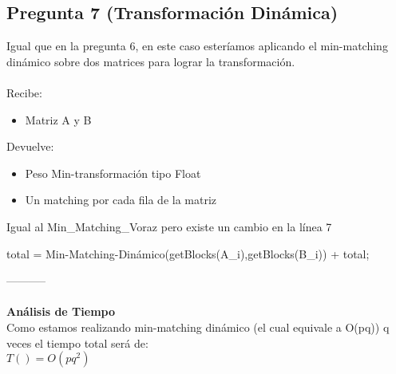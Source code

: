 \documentclass{article}
\newcommand{\TITLE}[1]{\item[#1]}
\begin{document}
		\subsection*{Pregunta 7 (Transformación Dinámica)}
		Igual que en la pregunta 6,  en este caso  esteríamos aplicando el min-matching dinámico sobre dos matrices para lograr la transformación.\\\\
		Recibe:
		\begin{itemize}
			\item Matriz A y B
		\end{itemize}
		Devuelve: 
		\begin{itemize}
			\item Peso Min-transformación tipo Float
			\item Un matching por cada fila de la matriz
		\end{itemize}
		Igual al Min\_Matching\_Voraz pero existe un cambio en la línea 7
		\\
		\begin{algorithmic}
			\TITLE{\textsc{Transformación-Dinámica}$(A, B)$}
			 total = Min-Matching-Dinámico(getBlocks(A\_i),getBlocks(B\_i)) + total;
		\end{algorithmic}
		-----------\\\\
		\textbf{Análisis de Tiempo}\\
		Como estamos realizando min-matching dinámico (el cual equivale a O(pq)) q veces el tiempo total será de:\\
		$T()=O(pq^2)$
\end{document}
